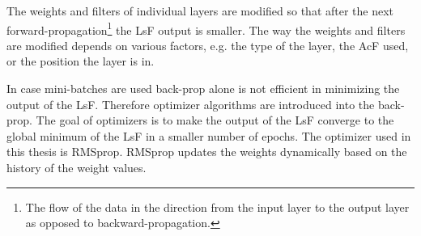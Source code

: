 The weights and filters of individual layers are modified so that after the next forward-propagation\footnote{The flow of the data in the direction from the input layer to the output layer as opposed to backward-propagation.} the LsF output is smaller. The way the weights and filters are modified depends on various factors, e.g. the type of the layer, the AcF used, or the position the layer is in.

In case mini-batches are used back-prop alone is not efficient in minimizing the output of the LsF. Therefore optimizer algorithms are introduced into the back-prop. The goal of optimizers is to make the output of the LsF converge to the global minimum of the LsF in  a smaller number of epochs. The optimizer used in this thesis is RMSprop. RMSprop updates the weights dynamically based on the history of the weight values.